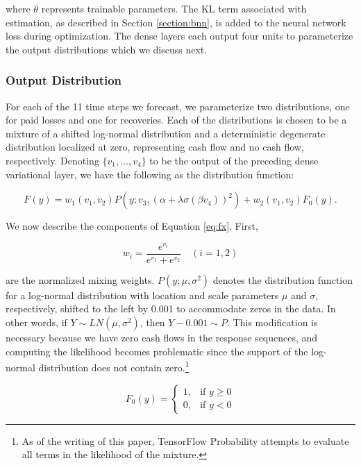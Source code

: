 \documentclass{article}
\begin{document}
where $\theta$ represents trainable parameters. The KL term associated with
estimation, as described in Section \ref{section:bnn}, is added to the neural 
network loss during optimization. The dense layers each output four units to 
parameterize the output distributions which we discuss next.

\subsubsection{Output Distribution}\label{section:outputdist}

For each of the 11 time steps we forecast, we parameterize two distributions, 
one for paid losses and one for recoveries. Each of the distributions is chosen 
to be a mixture of a shifted log-normal distribution and a deterministic 
degenerate distribution localized at zero, representing cash flow and no cash 
flow, respectively. Denoting $\{v_1,\dots,v_4\}$ to be the output of the 
preceding dense variational layer, we have the following as the distribution 
function:

\begin{equation} \label{eq:fx}
    F(y) = w_1(v_1, v_2)P(y; v_3, (\alpha + \lambda\sigma(\beta v_4))^2) + w_2(v_1, v_2)F_0(y).
\end{equation}

We now describe the components of Equation \ref{eq:fx}. First, 

\begin{equation}
    w_i = \frac{e^{v_i}}{e^{v_1} + e^{v_2}}\quad (i = 1, 2)
\end{equation}

are the normalized mixing weights. $P(y; \mu, \sigma^2)$ denotes the 
distribution function for a log-normal distribution with location and scale 
parameters $\mu$ and $\sigma$, respectively, shifted to the left by 0.001 to 
accommodate zeros in the data. In other words, if $Y \sim LN(\mu, \sigma^2)$, 
then $Y - 0.001 \sim P$. This modification is necessary because we have zero 
cash flows in the response sequences, and computing the likelihood becomes
problematic since the support of the log-normal distribution does not contain
zero.\footnote{As of the writing of this paper, TensorFlow Probability attempts
to evaluate all terms in the likelihood of the mixture.}

\begin{equation}
    F_{0}(y)=\left\{\begin{matrix} 1, & \mbox{if }y\ge 0 \\ 0, & \mbox{if }y<0 \end{matrix}\right.
\end{equation}
\end{document}
